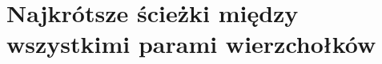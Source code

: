 \chapter{Najkrótsze ścieżki między wszystkimi parami wierzchołków}

\makeatletter
{}
\makeatother





\problems



